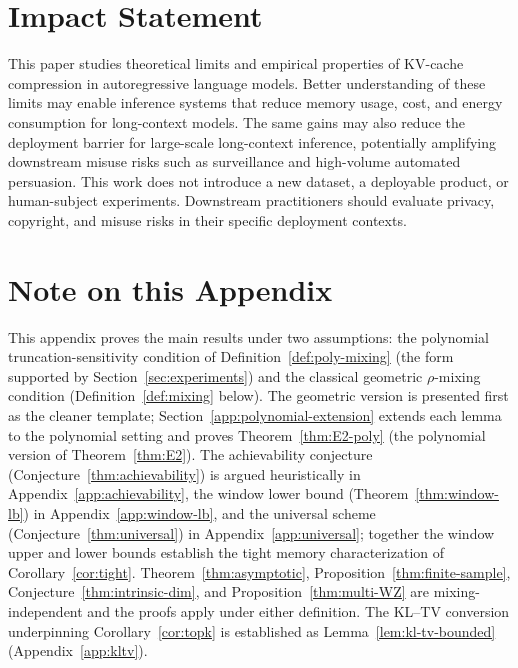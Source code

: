 \documentclass[11pt]{article}
\theoremstyle{plain}
\theoremstyle{definition}
\theoremstyle{remark}
\begin{document}
\section*{Impact Statement}

This paper studies theoretical limits and empirical properties of
KV-cache compression in autoregressive language models. Better
understanding of these limits may enable inference systems that
reduce memory usage, cost, and energy consumption for long-context
models. The same gains may also reduce the deployment barrier for
large-scale long-context inference, potentially amplifying
downstream misuse risks such as surveillance and high-volume
automated persuasion. This work does not introduce a new dataset, a
deployable product, or human-subject experiments. Downstream
practitioners should evaluate privacy, copyright, and misuse risks
in their specific deployment contexts.



\appendix

\section*{Note on this Appendix}

This appendix proves the main results under two assumptions:
the polynomial truncation-sensitivity condition of
Definition~\ref{def:poly-mixing} (the form supported by
Section~\ref{sec:experiments}) and the classical geometric
$\rho$-mixing condition (Definition~\ref{def:mixing} below). The
geometric version is presented first as the cleaner template;
Section~\ref{app:polynomial-extension} extends each lemma to the
polynomial setting and proves Theorem~\ref{thm:E2-poly} (the
polynomial version of Theorem~\ref{thm:E2}). The achievability
conjecture (Conjecture~\ref{thm:achievability}) is argued
heuristically in Appendix~\ref{app:achievability}, the window lower
bound (Theorem~\ref{thm:window-lb}) in Appendix~\ref{app:window-lb}, and
the universal scheme (Conjecture~\ref{thm:universal}) in
Appendix~\ref{app:universal}; together the window upper and lower
bounds establish the tight memory characterization of
Corollary~\ref{cor:tight}. Theorem~\ref{thm:asymptotic}, Proposition~\ref{thm:finite-sample},
Conjecture~\ref{thm:intrinsic-dim}, and Proposition~\ref{thm:multi-WZ} are
mixing-independent and the proofs apply under either definition.
The KL--TV conversion underpinning Corollary~\ref{cor:topk} is
established as Lemma~\ref{lem:kl-tv-bounded}
(Appendix~\ref{app:kltv}).
\end{document}

